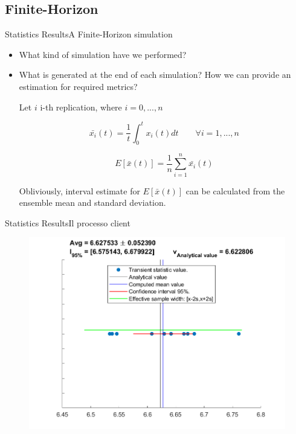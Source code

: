 \documentclass[10pt]{beamer}
\begin{document}
\subsection{Finite-Horizon}
\begin{frame}{Statistics Results}{A Finite-Horizon simulation}

\begin{itemize}
\item What kind of simulation have we performed?
\item What is generated at the end of each simulation? How we can provide an estimation for required metrics?

Let $i$ i-th replication, where $i = 0,...,n$

\begin{equation}
\bar{x_i}(t) = \dfrac{1}{t}\int_0^t x_i(t)dt \qquad \forall i=1,...,n
\end{equation}

\begin{equation}
E[\bar{x}(t)] = \dfrac{1}{n} \sum_{i=1}^n \bar{x_i}(t)
\end{equation}

Obliviously, interval estimate for $E[\bar{x}(t)]$ can be calculated from the ensemble mean and standard deviation.

\end{itemize}

\end{frame}

\begin{frame}[fragile]{Statistics Results}{Il processo client}


\begin{figure}
\centering
\includegraphics[width=\textwidth]{./images/EnsembleStatisticsCloud_Class1JobsNumber.png}
\end{figure}

\end{frame}
\end{document}
